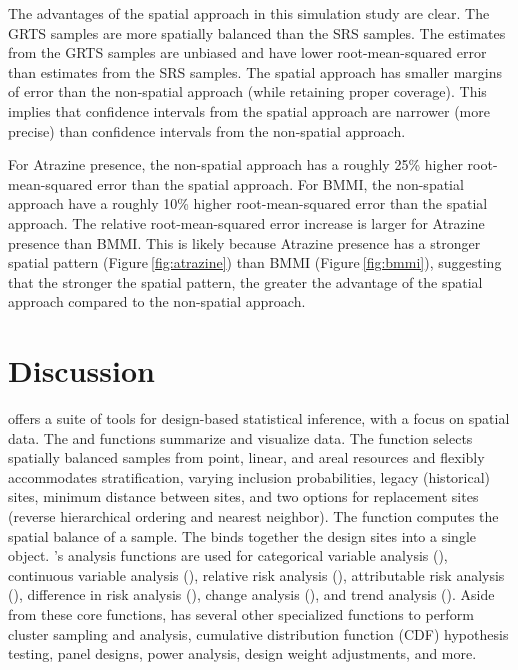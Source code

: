 \documentclass[
  shortnames]{jss}
\begin{document}
The advantages of the spatial approach in this simulation study are
clear. The GRTS samples are more spatially balanced than the SRS
samples. The estimates from the GRTS samples are unbiased and have lower
root-mean-squared error than estimates from the SRS samples. The spatial
approach has smaller margins of error than the non-spatial approach
(while retaining proper coverage). This implies that confidence
intervals from the spatial approach are narrower (more precise) than
confidence intervals from the non-spatial approach.

For Atrazine presence, the non-spatial approach has a roughly 25\%
higher root-mean-squared error than the spatial approach. For BMMI, the
non-spatial approach have a roughly 10\% higher root-mean-squared error
than the spatial approach. The relative root-mean-squared error increase
is larger for Atrazine presence than BMMI. This is likely because
Atrazine presence has a stronger spatial pattern
(Figure\(~\)\ref{fig:atrazine}) than BMMI (Figure\(~\)\ref{fig:bmmi}),
suggesting that the stronger the spatial pattern, the greater the
advantage of the spatial approach compared to the non-spatial approach.

\hypertarget{sec:discussion}{%
\section{Discussion}\label{sec:discussion}}

 offers a suite of tools for design-based statistical
inference, with a focus on spatial data. The  and
 functions summarize and visualize data. The 
function selects spatially balanced samples from point, linear, and
areal resources and flexibly accommodates stratification, varying
inclusion probabilities, legacy (historical) sites, minimum distance
between sites, and two options for replacement sites (reverse
hierarchical ordering and nearest neighbor). The 
function computes the spatial balance of a sample. The 
binds together the design sites into a single  object.
's analysis functions are used for categorical variable
analysis (), continuous variable analysis
(), relative risk analysis
(), attributable risk analysis
(), difference in risk analysis
(), change analysis (),
and trend analysis (). Aside from these core
functions,  has several other specialized functions to
perform cluster sampling and analysis, cumulative distribution function
(CDF) hypothesis testing, panel designs, power analysis, design weight
adjustments, and more.
\end{document}
